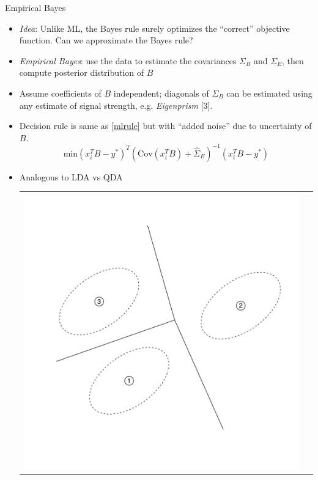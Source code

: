 \documentclass[final]{beamer}
\newlength{\onecolwid}
\begin{document}
\begin{frame}[t]
\begin{columns}[t]
\begin{column}{\onecolwid}
\begin{block}{Empirical Bayes}

\begin{itemize}
\item \emph{Idea}: Unlike ML, the Bayes rule surely optimizes the ``correct'' objective function.  Can we approximate the Bayes rule?
\item \emph{Empirical Bayes}: use the data to estimate the covariances
$\Sigma_B$ and $\Sigma_E$, then compute posterior distribution of $B$
\item Assume coefficients of $B$ independent; diagonals of $\Sigma_B$ can be estimated using any estimate of signal strength, e.g. \emph{Eigenprism} [3].
\item Decision rule is same as \eqref{mlrule} but with ``added noise'' due to uncertainty of $B$.
\[
\text{min} (x_i^T B - y^*)^T (\text{Cov}(x_i^T B) + \hat{\Sigma}_E)^{-1} (x_i^T B - y^*)
\]
\item Analogous to LDA vs QDA
\begin{center}
\begin{tabular}{cc}
\includegraphics[scale = 0.5, trim = 0in 1.5in 0in 0in]{illus1_A.pdf} & 

\end{tabular}
\end{center}
\end{itemize}
\end{block}
\end{column}
\end{columns}
\end{frame}
\end{document}
